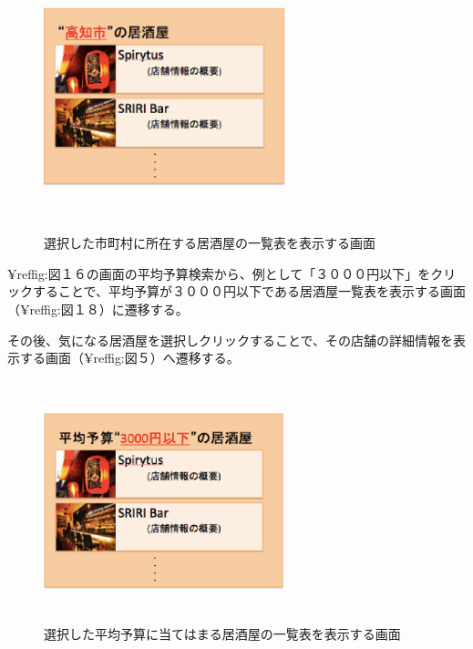 \documentclass[a4j,titlepage]{jarticle}
\begin{document}
\begin {figure}[!htbp]
    \begin{center}
    \includegraphics [height=7cm, width=7cm]{17.eps}
　　    \caption {選択した市町村に所在する居酒屋の一覧表を表示する画面}
    \label {fig:17}
    \end{center}
\end {figure}



¥ref{fig:図１６}の画面の平均予算検索から、例として「３０００円以下」をクリックすることで、平均予算が３０００円以下である居酒屋一覧表を表示する画面（¥ref{fig:図１８}）に遷移する。



その後、気になる居酒屋を選択しクリックすることで、その店舗の詳細情報を表示する画面（¥ref{fig:図５}）へ遷移する。
\clearpage

\begin {figure}[!htbp]
    \begin{center}
    \includegraphics [height=7cm, width=7cm]{18.eps}
    \caption {選択した平均予算に当てはまる居酒屋の一覧表を表示する画面}
    \label {fig:18}
    \end{center}
\end {figure}
\end{document}
